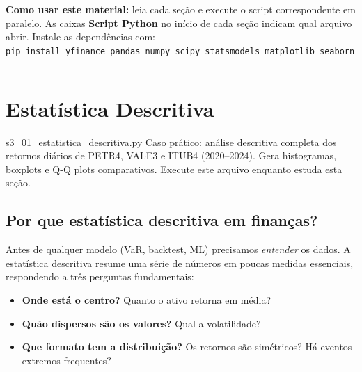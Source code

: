 \documentclass[11pt,a4paper]{article}
\newcommand{\code}[1]{%
  \colorbox{quantlightgray}{\texttt{\small\color{quantdark}#1}}%
}
\theoremstyle{quant}
\begin{document}
\vspace{1em}

\begin{highlightbox}
  \textbf{Como usar este material:} leia cada seção e execute o script correspondente
  em paralelo. As caixas \textbf{Script Python} no início de cada seção indicam qual
  arquivo abrir. Instale as dependências com:\\[4pt]
  \code{pip install yfinance pandas numpy scipy statsmodels matplotlib seaborn}
\end{highlightbox}

\vspace{1.2em}
\textcolor{quantpurple}{\rule{\textwidth}{1.2pt}}

\newpage

\renewcommand{\contentsname}{Sumário}
\tableofcontents

\newpage

\section{Estatística Descritiva}
\label{sec:descritiva}

\begin{caixapy}{s3\_01\_estatistica\_descritiva.py}
  Caso prático: análise descritiva completa dos retornos diários de PETR4, VALE3 e ITUB4
  (2020--2024). Gera histogramas, boxplots e Q-Q plots comparativos.
  Execute este arquivo enquanto estuda esta seção.
\end{caixapy}

\subsection{Por que estatística descritiva em finanças?}

Antes de qualquer modelo (VaR, backtest, ML) precisamos \emph{entender} os dados.
A estatística descritiva resume uma série de números em poucas medidas essenciais,
respondendo a três perguntas fundamentais:

\begin{itemize}
  \item \textbf{Onde está o centro?} Quanto o ativo retorna em média?
  \item \textbf{Quão dispersos são os valores?} Qual a volatilidade?
  \item \textbf{Que formato tem a distribuição?} Os retornos são simétricos? Há eventos extremos frequentes?
\end{itemize}
\end{document}
